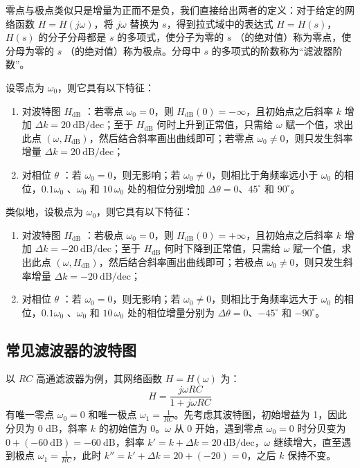 \documentclass[UTF8]{report}
\theoremstyle{MyLineTheoremStyle} %
\theoremstyle{MyBlockTheoremStyle} %
\theoremstyle{MySubsubsectionStyle} %
\begin{document}
零点与极点类似只是增量为正而不是负，我们直接给出两者的定义：对于给定的网络函数 $H = H(j\omega)$，将 $j \omega$ 替换为 $s$，得到拉式域中的表达式 $H = H(s)$，$H(s)$ 的分子分母都是 $s$ 的多项式，使分子为零的 $s$ （的绝对值）称为零点，使分母为零的 $s$ （的绝对值）称为极点。分母中 $s$ 的多项式的阶数称为“滤波器阶数”。

设零点为 $\omega_0$，则它具有以下特征：
\begin{enumerate}
\item 对波特图 $H_{\text{dB}}$ ：若零点 $\omega_0 = 0$，则 $H_{\text{dB}}(0) = -\infty$，且初始点之后斜率 $k$ 增加 $\Delta k = 20 \ \mathrm{dB / dec}$；至于 $H_{\text{dB}}$ 何时上升到正常值，只需给 $\omega$ 赋一个值，求出此点 $(\omega, H_{\text{dB}})$，然后结合斜率画出曲线即可；若零点 $\omega_0 \ne 0$，则只发生斜率增量 $\Delta k = 20 \ \mathrm{dB / dec}$；

\item 对相位 $\theta$ ：若 $\omega_0 = 0$，则无影响；若 $\omega_0 \neq 0$，则相比于角频率远小于 $\omega_0$ 的相位，$0.1 \omega_0$ 、$\omega_0$ 和 $10 \, \omega_0$ 处的相位分别增加 $\Delta \theta = 0$、$45^\circ$ 和 $90^\circ$。
\end{enumerate}
类似地，设极点为 $\omega_0$，则它具有以下特征：
\begin{enumerate}
\item 对波特图 $H_{\text{dB}}$ ：若极点 $\omega_0 = 0$，则 $H_{\text{dB}}(0) = +\infty$，且初始点之后斜率 $k$ 增加 $\Delta k = -20 \ \mathrm{dB / dec}$；至于 $H_{\text{dB}}$ 何时下降到正常值，只需给 $\omega$ 赋一个值，求出此点 $(\omega, H_{\text{dB}})$，然后结合斜率画出曲线即可；若极点 $\omega_0 \ne 0$，则只发生斜率增量 $\Delta k = -20 \ \mathrm{dB / dec}$；
\item 对相位 $\theta$ ：若 $\omega_0 = 0$，则无影响；若 $\omega_0 \neq 0$，则相比于角频率远大于 $\omega_0$ 的相位，$0.1 \omega_0$ 、$\omega_0$ 和 $10 \, \omega_0$ 处的相位增量分别为 $\Delta \theta = 0$、$-45^\circ$ 和 $-90^\circ$。
\end{enumerate}

\subsection{常见滤波器的波特图}

以 $RC$ 高通滤波器为例，其网络函数 $H = H(\omega)$ 为：
\begin{equation}
H = \frac{j \omega R C}{1 + j \omega R C}
\end{equation}
有唯一零点 $\omega_0 = 0$ 和唯一极点 $\omega_1 = \frac{1}{RC}$。先考虑其波特图，初始增益为 1，因此分贝为 0 dB，斜率 $k$ 的初始值为 0。$\omega$ 从 0 开始，遇到零点 $\omega_0 = 0$ 时分贝变为 $0 + (-60 \ \mathrm{dB}) = -60 \ \mathrm{dB}$，斜率 $k' = k + \Delta k = 20 \ \mathrm{dB/dec}$，$\omega$ 继续增大，直至遇到极点 $\omega_1 = \frac{1}{RC}$，此时 $k'' = k' + \Delta k = 20 + (- 20) = 0$，之后 $k$ 保持不变。
\end{document}

